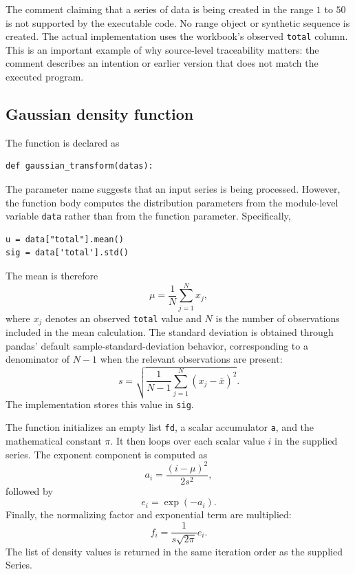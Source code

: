 \documentclass[11pt,a4paper]{article}
\begin{document}
The comment claiming that a series of data is being created in the range $1$ to $50$ is not supported by the executable code. No range object or synthetic sequence is created. The actual implementation uses the workbook's observed \texttt{total} column. This is an important example of why source-level traceability matters: the comment describes an intention or earlier version that does not match the executed program.

\subsection{Gaussian density function}
The function is declared as
\begin{lstlisting}
def gaussian_transform(datas):
\end{lstlisting}
The parameter name suggests that an input series is being processed. However, the function body computes the distribution parameters from the module-level variable \texttt{data} rather than from the function parameter. Specifically,
\begin{lstlisting}
u = data["total"].mean()
sig = data['total'].std()
\end{lstlisting}
The mean is therefore
\begin{equation}
 \mu = \frac{1}{N}\sum_{j=1}^{N} x_j,
\end{equation}
where $x_j$ denotes an observed \texttt{total} value and $N$ is the number of observations included in the mean calculation. The standard deviation is obtained through pandas' default sample-standard-deviation behavior, corresponding to a denominator of $N-1$ when the relevant observations are present:
\begin{equation}
 s = \sqrt{\frac{1}{N-1}\sum_{j=1}^{N}(x_j-\bar{x})^2}.
\end{equation}
The implementation stores this value in \texttt{sig}.

The function initializes an empty list \texttt{fd}, a scalar accumulator \texttt{a}, and the mathematical constant $\pi$. It then loops over each scalar value $i$ in the supplied series. The exponent component is computed as
\begin{equation}
 a_i = \frac{(i-\mu)^2}{2s^2},
\end{equation}
followed by
\begin{equation}
 e_i = \exp(-a_i).
\end{equation}
Finally, the normalizing factor and exponential term are multiplied:
\begin{equation}
 f_i = \frac{1}{s\sqrt{2\pi}} e_i.
\end{equation}
The list of density values is returned in the same iteration order as the supplied Series.
\end{document}
